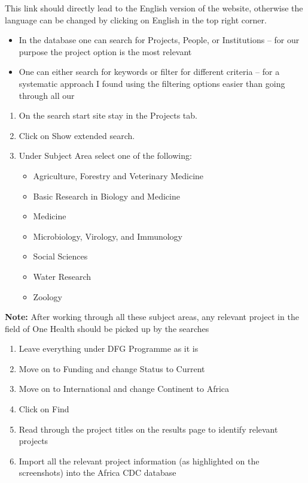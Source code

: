 \documentclass[
]{book}
\begin{document}
This link should directly lead to the English version of the website, otherwise the language can be changed by clicking on English in the top right corner.

\begin{itemize}
\item
  In the database one can search for Projects, People, or Institutions -- for our purpose the project option is the most relevant
\item
  One can either search for keywords or filter for different criteria -- for a systematic approach I found using the filtering options easier than going through all our
\end{itemize}

\begin{enumerate}
\def\labelenumi{\arabic{enumi}.}
\item
  On the search start site stay in the Projects tab.
\item
  Click on Show extended search.
\item
  Under Subject Area select one of the following:

  \begin{itemize}
  \item
    Agriculture, Forestry and Veterinary Medicine
  \item
    Basic Research in Biology and Medicine
  \item
    Medicine
  \item
    Microbiology, Virology, and Immunology
  \item
    Social Sciences
  \item
    Water Research
  \item
    Zoology
  \end{itemize}
\end{enumerate}

\textbf{Note:} After working through all these subject areas, any relevant project in the field of One Health should be picked up by the searches

\begin{enumerate}
\def\labelenumi{\arabic{enumi}.}
\setcounter{enumi}{3}
\item
  Leave everything under DFG Programme as it is
\item
  Move on to Funding and change Status to Current
\item
  Move on to International and change Continent to Africa
\item
  Click on Find
\item
  Read through the project titles on the results page to identify relevant projects
\item
  Import all the relevant project information (as highlighted on the screenshots) into the Africa CDC database
\end{enumerate}
\end{document}

